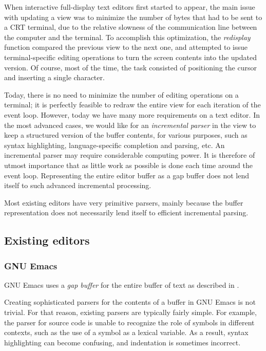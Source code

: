 When interactive full-display text editors first started to appear,
the main issue with updating a view was to minimize the number of
bytes that had to be sent to a CRT terminal, due to the relative
slowness of the communication line between the computer and the
terminal.  To accomplish this optimization, the \emph{redisplay}
function compared the previous view to the next one, and attempted to
issue terminal-specific editing operations to turn the screen contents
into the updated version.  Of course, most of the time, the task
consisted of positioning the cursor and inserting a single character.

Today, there is no need to minimize the number of editing operations
on a terminal; it is perfectly feasible to redraw the entire view for
each iteration of the event loop.  However, today we have many more
requirements on a text editor.  In the most advanced cases, we would
like for an \emph{incremental parser} in the view to keep a structured
version of the buffer contents, for various purposes, such as syntax
highlighting, language-specific completion and parsing, etc.  An
incremental parser may require considerable computing power.  It is
therefore of utmost importance that as little work as possible is done
each time around the event loop.  Representing the entire editor
buffer as a gap buffer does not lend itself to such advanced
incremental processing.

Most existing editors have very primitive parsers, mainly because the
buffer representation does not necessarily lend itself to efficient
incremental parsing.

\subsection{Existing editors}

\subsubsection{GNU Emacs}

GNU Emacs \cite{GNUEmacsLispReferenceManual}
\cite{CraftOfTextEditiing} uses a \emph{gap buffer} for the entire
buffer of text as described in .

Creating sophisticated parsers for the contents of a buffer in GNU
Emacs is not trivial.  For that reason, existing parsers are typically
fairly simple.  For example, the parser for \commonlisp{} source code
is unable to recognize the role of symbols in different contexts, such
as the use of a \commonlisp{} symbol as a lexical variable.  As a
result, syntax highlighting can become confusing, and indentation is
sometimes incorrect.

